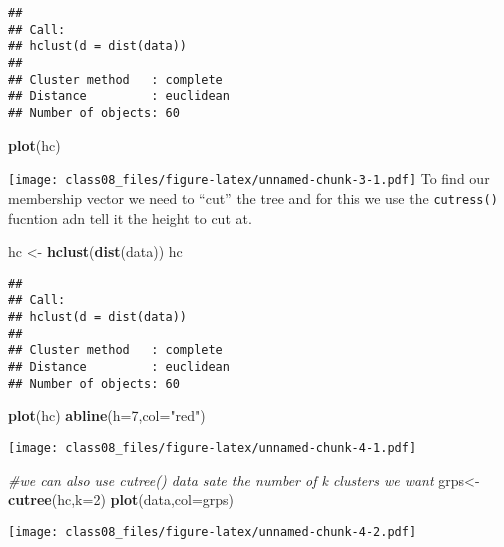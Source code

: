 \documentclass[
]{article}
\newenvironment{Shaded}{\begin{snugshade}}{\end{snugshade}}
\newcommand{\CommentTok}[1]{\textcolor[rgb]{0.56,0.35,0.01}{\textit{#1}}}
\newcommand{\DataTypeTok}[1]{\textcolor[rgb]{0.13,0.29,0.53}{#1}}
\newcommand{\DecValTok}[1]{\textcolor[rgb]{0.00,0.00,0.81}{#1}}
\newcommand{\KeywordTok}[1]{\textcolor[rgb]{0.13,0.29,0.53}{\textbf{#1}}}
\newcommand{\NormalTok}[1]{#1}
\newcommand{\StringTok}[1]{\textcolor[rgb]{0.31,0.60,0.02}{#1}}
\begin{document}
\begin{verbatim}
## 
## Call:
## hclust(d = dist(data))
## 
## Cluster method   : complete 
## Distance         : euclidean 
## Number of objects: 60
\end{verbatim}

\begin{Shaded}
\begin{Highlighting}[]
\KeywordTok{plot}\NormalTok{(hc)}
\end{Highlighting}
\end{Shaded}

\texttt{[image: class08\_files/figure-latex/unnamed-chunk-3-1.pdf]} To
find our membership vector we need to ``cut'' the tree and for this we
use the \texttt{cutress()} fucntion adn tell it the height to cut at.

\begin{Shaded}
\begin{Highlighting}[]
\NormalTok{hc <-}\StringTok{ }\KeywordTok{hclust}\NormalTok{(}\KeywordTok{dist}\NormalTok{(data))}
\NormalTok{hc}
\end{Highlighting}
\end{Shaded}

\begin{verbatim}
## 
## Call:
## hclust(d = dist(data))
## 
## Cluster method   : complete 
## Distance         : euclidean 
## Number of objects: 60
\end{verbatim}

\begin{Shaded}
\begin{Highlighting}[]
\KeywordTok{plot}\NormalTok{(hc)}
\KeywordTok{abline}\NormalTok{(}\DataTypeTok{h=}\DecValTok{7}\NormalTok{,}\DataTypeTok{col=}\StringTok{"red"}\NormalTok{)}
\end{Highlighting}
\end{Shaded}

\texttt{[image: class08\_files/figure-latex/unnamed-chunk-4-1.pdf]}

\begin{Shaded}
\begin{Highlighting}[]
\CommentTok{#we can also use cutree() data sate the number of k clusters we want }
\NormalTok{grps<-}\KeywordTok{cutree}\NormalTok{(hc,}\DataTypeTok{k=}\DecValTok{2}\NormalTok{)}
\KeywordTok{plot}\NormalTok{(data,}\DataTypeTok{col=}\NormalTok{grps)}
\end{Highlighting}
\end{Shaded}

\texttt{[image: class08\_files/figure-latex/unnamed-chunk-4-2.pdf]}
\end{document}
